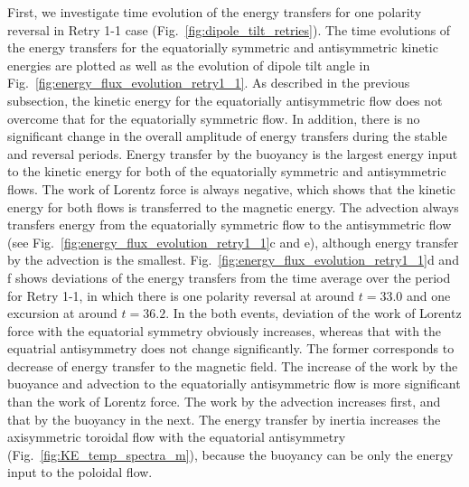 First, we investigate time evolution of the energy transfers for one polarity reversal in Retry 1-1 case (Fig.~\ref{fig:dipole_tilt_retries}). 
The time evolutions of the energy transfers for the equatorially symmetric and antisymmetric kinetic energies are plotted as well as the evolution of dipole tilt angle in Fig.~\ref{fig:energy_flux_evolution_retry1_1}. 
As described in the previous subsection, the kinetic energy for the equatorially antisymmetric flow does not overcome that for the equatorially symmetric flow. 
In addition, there is no significant change in the overall amplitude of energy transfers during the stable and reversal periods. 
Energy transfer by the buoyancy is the largest energy input to the kinetic energy for both of the equatorially symmetric and antisymmetric flows. 
The work of Lorentz force is always negative, which shows that the kinetic energy for both flows is transferred to the magnetic energy. 
The advection always transfers energy from the equatorially symmetric flow to the antisymmetric flow (see Fig.~\ref{fig:energy_flux_evolution_retry1_1}c and e), although energy transfer by the advection is the smallest.
Fig.~\ref{fig:energy_flux_evolution_retry1_1}d and f shows deviations of the energy transfers from the time average over the period for Retry 1-1, in which there is one polarity reversal at around $t = 33.0$ and one excursion at around $t = 36.2$. 
{\color{magenta}
In the both events, deviation of the work of Lorentz force with the equatorial symmetry obviously increases, whereas that with the equatrial antisymmetry does not change significantly.
The former corresponds to decrease of energy transfer to the magnetic field.
The increase of the work by the buoyance and advection to the equatorially antisymmetric flow is more significant than the work of Lorentz force.
}
The work by the advection increases first, and that by the buoyancy in the next. 
The energy transfer by inertia increases the axisymmetric toroidal flow with the equatorial antisymmetry (Fig.~\ref{fig:KE_temp_spectra_m}), because the buoyancy can be only the energy input to the poloidal flow.

